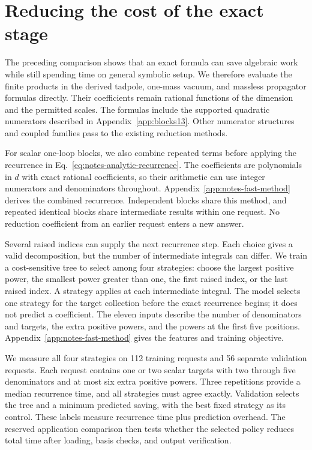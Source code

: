 \section{Reducing the cost of the exact stage}
\label{sec:notes-fast-method}
The preceding comparison shows that an exact formula can save algebraic work while still spending time on general symbolic setup. We therefore evaluate the finite products in the derived tadpole, one-mass vacuum, and massless propagator formulas directly. Their coefficients remain rational functions of the dimension and the permitted scales. The formulas include the supported quadratic numerators described in Appendix~\ref{app:blocks13}. Other numerator structures and coupled families pass to the existing reduction methods.

For scalar one-loop blocks, we also combine repeated terms before applying the recurrence in Eq.~\eqref{eq:notes-analytic-recurrence}. The coefficients are polynomials in $d$ with exact rational coefficients, so their arithmetic can use integer numerators and denominators throughout. Appendix~\ref{app:notes-fast-method} derives the combined recurrence. Independent blocks share this method, and repeated identical blocks share intermediate results within one request. No reduction coefficient from an earlier request enters a new answer.

Several raised indices can supply the next recurrence step. Each choice gives a valid decomposition, but the number of intermediate integrals can differ. We train a cost-sensitive tree to select among four strategies: choose the largest positive power, the smallest power greater than one, the first raised index, or the last raised index. A strategy applies at each intermediate integral. The model selects one strategy for the target collection before the exact recurrence begins; it does not predict a coefficient. The eleven inputs describe the number of denominators and targets, the extra positive powers, and the powers at the first five positions. Appendix~\ref{app:notes-fast-method} gives the features and training objective.

We measure all four strategies on 112 training requests and 56 separate validation requests. Each request contains one or two scalar targets with two through five denominators and at most six extra positive powers. Three repetitions provide a median recurrence time, and all strategies must agree exactly. Validation selects the tree and a minimum predicted saving, with the best fixed strategy as its control. These labels measure recurrence time plus prediction overhead. The reserved application comparison then tests whether the selected policy reduces total time after loading, basis checks, and output verification.

